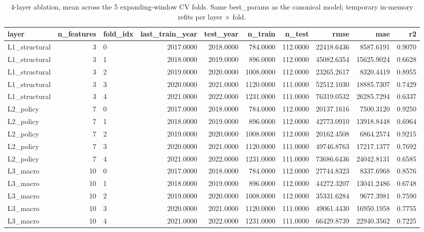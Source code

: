 \begin{table}
\caption{4-layer ablation, mean across the 5 expanding-window CV folds. Same best\_params as the canonical model; temporary in-memory refits per layer × fold.}
\label{tbl:ch4-ablation-cv}
\begin{tabular}{lrlrrrrrrr}
\toprule
layer & n\_features & fold\_idx & last\_train\_year & test\_year & n\_train & n\_test & rmse & mae & r2 \\
\midrule
L1\_structural & 3 & 0 & 2017.0000 & 2018.0000 & 784.0000 & 112.0000 & 22418.6436 & 8587.6191 & 0.9070 \\
L1\_structural & 3 & 1 & 2018.0000 & 2019.0000 & 896.0000 & 112.0000 & 45082.6354 & 15625.9024 & 0.6628 \\
L1\_structural & 3 & 2 & 2019.0000 & 2020.0000 & 1008.0000 & 112.0000 & 23265.2617 & 8320.4419 & 0.8955 \\
L1\_structural & 3 & 3 & 2020.0000 & 2021.0000 & 1120.0000 & 111.0000 & 52512.1030 & 18885.7307 & 0.7429 \\
L1\_structural & 3 & 4 & 2021.0000 & 2022.0000 & 1231.0000 & 111.0000 & 76319.0532 & 26285.7294 & 0.6337 \\
L2\_policy & 7 & 0 & 2017.0000 & 2018.0000 & 784.0000 & 112.0000 & 20137.1616 & 7500.3120 & 0.9250 \\
L2\_policy & 7 & 1 & 2018.0000 & 2019.0000 & 896.0000 & 112.0000 & 42773.0910 & 13918.8448 & 0.6964 \\
L2\_policy & 7 & 2 & 2019.0000 & 2020.0000 & 1008.0000 & 112.0000 & 20162.4508 & 6864.2574 & 0.9215 \\
L2\_policy & 7 & 3 & 2020.0000 & 2021.0000 & 1120.0000 & 111.0000 & 49746.8763 & 17217.1377 & 0.7692 \\
L2\_policy & 7 & 4 & 2021.0000 & 2022.0000 & 1231.0000 & 111.0000 & 73686.6436 & 24042.8131 & 0.6585 \\
L3\_macro & 10 & 0 & 2017.0000 & 2018.0000 & 784.0000 & 112.0000 & 27744.8323 & 8337.6968 & 0.8576 \\
L3\_macro & 10 & 1 & 2018.0000 & 2019.0000 & 896.0000 & 112.0000 & 44272.3207 & 13041.2486 & 0.6748 \\
L3\_macro & 10 & 2 & 2019.0000 & 2020.0000 & 1008.0000 & 112.0000 & 35331.6284 & 9677.3981 & 0.7590 \\
L3\_macro & 10 & 3 & 2020.0000 & 2021.0000 & 1120.0000 & 111.0000 & 49061.4430 & 16950.1958 & 0.7755 \\
L3\_macro & 10 & 4 & 2021.0000 & 2022.0000 & 1231.0000 & 111.0000 & 66429.8739 & 22940.3562 & 0.7225 \\

\end{tabular}
\end{table}
